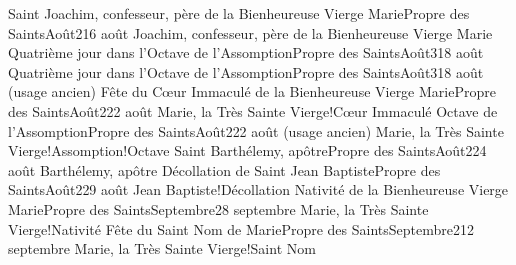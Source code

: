 \documentclass[twoside, french]{book}
\begin{document}
        {Saint Joachim, confesseur, père de la Bienheureuse Vierge Marie}{Propre des Saints}{Août}{2}{16 août}
        {}{}{Joachim, confesseur, père de la Bienheureuse Vierge Marie}{}{}
        {Quatrième jour dans l’Octave de l’Assomption}{Propre des Saints}{Août}{3}{18 août}
        {}{}{}{}{}
        {Quatrième jour dans l’Octave de l’Assomption}{Propre des Saints}{Août}{3}{18 août (usage ancien)}
        {}{}{}{}{}
        {Fête du Cœur Immaculé de la Bienheureuse Vierge Marie}{Propre des Saints}{Août}{2}{22 août}
        {}{}{Marie, la Très Sainte Vierge!Cœur Immaculé}{}{}
        {Octave de l’Assomption}{Propre des Saints}{Août}{2}{22 août (usage ancien)}
        {}{}{Marie, la Très Sainte Vierge!Assomption!Octave}{}{}
        {Saint Barthélemy, apôtre}{Propre des Saints}{Août}{2}{24 août}
        {}{}{Barthélemy, apôtre}{}{}
        {Décollation de Saint Jean Baptiste}{Propre des Saints}{Août}{2}{29 août}
        {}{}{Jean Baptiste!Décollation}{}{}
        {Nativité de la Bienheureuse Vierge Marie}{Propre des Saints}{Septembre}{2}{8 septembre}
        {}{}{Marie, la Très Sainte Vierge!Nativité}{}{}
        {Fête du Saint Nom de Marie}{Propre des Saints}{Septembre}{2}{12 septembre}
        {}{}{Marie, la Très Sainte Vierge!Saint Nom}{}{}
\end{document}
